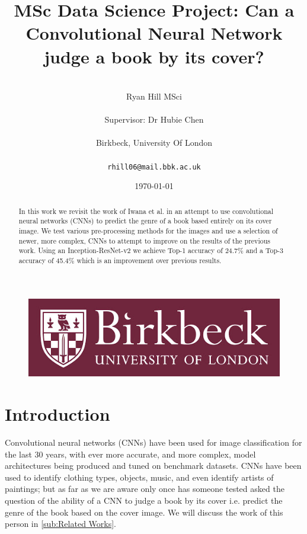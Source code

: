 \documentclass[12pt]{article}
\numberwithin{equation}{section}
\numberwithin{figure}{section}
\begin{document}
\renewcommand\citeform[1]{[#1]}
%
\title{MSc Data Science Project: Can a Convolutional Neural Network judge a book by its cover?}
\author{\\Ryan Hill MSci\\\\
Supervisor: Dr Hubie Chen\\\\
Birkbeck, University Of London\\\\
\texttt{rhill06@mail.bbk.ac.uk}}
\date{\today}
\maketitle
\thispagestyle{empty}
\graphicspath{{images/}}
\begin{abstract}
	In this work we revisit the work of Iwana et al.\cite{KenjiIwana} in an attempt to use convolutional neural networks (CNNs) to predict the genre of a book based entirely on its cover image. We test various pre-processing methods for the images and use a selection of newer, more complex, CNNs to attempt to improve on the results of the previous work. Using an Inception-ResNet-v2 we achieve Top-1 accuracy of 24.7\% and a Top-3 accuracy of 45.4\% which is an improvement over previous results.
\end{abstract}
\begin{figure}[!b]
	\centering
	\includegraphics[scale=0.4]{bbk_logo.jpg}
\end{figure}

\clearpage
%
{\hypersetup{linkcolor=black}
\tableofcontents}
\thispagestyle{empty}
\clearpage
%
\setcounter{page}{1}
\section{Introduction} 
\label{sec:intro}
Convolutional neural networks (CNNs) have been used for image classification for the last 30 years\cite{Cun1989}, with ever more accurate, and more complex, model architectures being produced and tuned on benchmark datasets. CNNs have been used to identify clothing types, objects, music, and even identify artists of paintings; but as far as we are aware only once has someone tested asked the question of the ability of a CNN to judge a book by its cover i.e. predict the genre of the book based on the cover image. We will discuss the work of this person in \cref{sub:Related Works}. 
\end{document}
